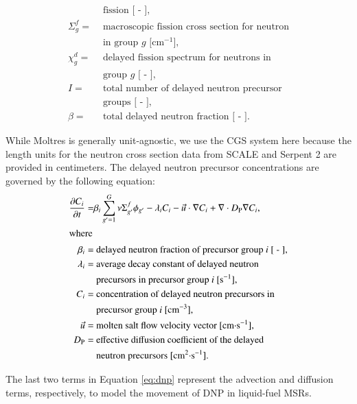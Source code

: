\begin{align}
    &\text{ fission [ - ],} \nonumber \\
    \Sigma^f_{g} =& \text{ macroscopic fission cross section for neutron}
    \nonumber \\
    &\text{ in group $g$ [cm$^{-1}$],} \nonumber \\
    \chi^d_g =& \text{ delayed fission spectrum for neutrons in} \nonumber \\
    &\text{ group $g$ [ - ],} \nonumber \\
    I =& \text{ total number of delayed neutron precursor} \nonumber \\
    &\text{ groups [ - ],} \nonumber \\
    \beta =& \text{ total delayed neutron fraction [ - ].} \nonumber
\end{align}

While Moltres is generally unit-agnostic, we use the CGS system here because
the length units for the neutron cross section data from SCALE and Serpent 2
are provided in centimeters. The delayed neutron precursor concentrations are
governed by the following equation:
%
\begin{align}
    \frac{\partial C_i}{\partial t} =& \beta_i \sum^G_{g'=1} \nu \Sigma^f_{g'}
    \phi_{g'} - \lambda_i C_i - \vec{u} \cdot \nabla C_i + \nabla \cdot
    D_{\text{P}} \nabla C_i, \label{eq:dnp} \\
    \intertext{where}
    \beta_i =& \text{ delayed neutron fraction of precursor group $i$ [ - ],}
    \nonumber \\
    \lambda_i =& \text{ average decay constant of delayed neutron} \nonumber \\
    &\text{ precursors in precursor group $i$ [s$^{-1}$],} \nonumber \\
    C_i =& \text{ concentration of delayed neutron precursors in}
    \nonumber \\
    &\text{ precursor group $i$ [cm$^{-3}$],} \nonumber \\
    \vec{u} =& \text{ molten salt flow velocity vector [cm$\cdot$s$^{-1}$],}
    \nonumber \\
    D_{\text{P}} =& \text{ effective diffusion coefficient of the delayed}
    \nonumber \\
    &\text{ neutron precursors [cm$^2\cdot$s$^{-1}$].} \nonumber
\end{align}

The last two terms in Equation \ref{eq:dnp} represent the advection and
diffusion terms, respectively, to model the movement of \gls{DNP} in
liquid-fuel \glspl{MSR}.

